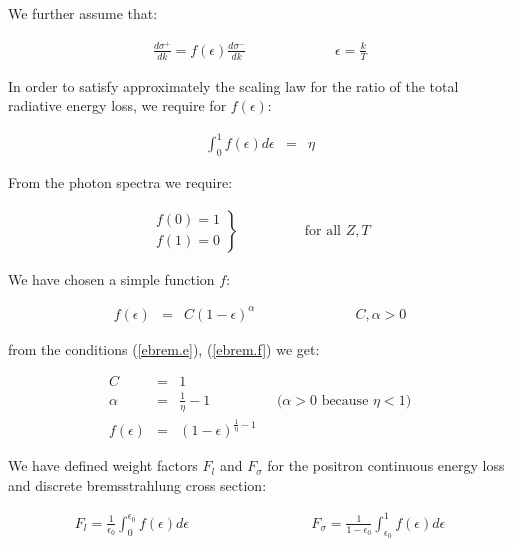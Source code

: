 We further assume that:

\begin{eqnarray}
\frac{d\sigma^+}{dk} = f(\epsilon) \frac{d\sigma^-}{dk}
& \hspace{2cm} &
\epsilon = \frac{k}{T}
\label{ebrem.d}
\end{eqnarray}

In order to satisfy approximately the scaling law for the ratio
of the total radiative energy loss, we require for $f(\epsilon)$:

\begin{eqnarray}
\int^{1}_{0}{f(\epsilon)d\epsilon} & = & \eta
\label{ebrem.e}
\end{eqnarray}

From the photon spectra we require:

\begin{eqnarray}
\left .
\begin{array}{l}
f(0) = 1 \\
f(1) = 0
\end{array}
\right \} \hspace{2cm} \mbox{for all $Z,T$}
\label{ebrem.f}
\end{eqnarray}

We have chosen a simple function $f$:

\begin{eqnarray}
f(\epsilon) & = & C (1-\epsilon)^{\alpha} \hspace{3cm} C,\alpha > 0
\label{ebrem.g}
\end{eqnarray}

from the conditions (\ref{ebrem.e}), (\ref{ebrem.f}) we get:

\begin{eqnarray*}
C & = & 1 \\
\alpha & = & \frac{1}{\eta} - 1 \hspace{2cm}
\mbox{($\alpha > 0$ because $\eta < 1$)} \\
f(\epsilon) & = & (1-\epsilon)^{\frac{1}{\eta}-1}
\end{eqnarray*}

We have defined weight factors $F_{l}$ and $F_{\sigma}$ for the
positron continuous energy loss and discrete bremsstrahlung cross
section:

\begin{eqnarray}
F_{l} = \frac{1}{\epsilon_{0}} \int^{\epsilon_{0}}_{0}
{f(\epsilon)d\epsilon} & \hspace{3cm} &
F_{\sigma} = \frac{1}{1-\epsilon_{0}} \int^{1}_{\epsilon_{0}}
{f(\epsilon)d\epsilon}
\label{ebrem.h}
\end{eqnarray}

